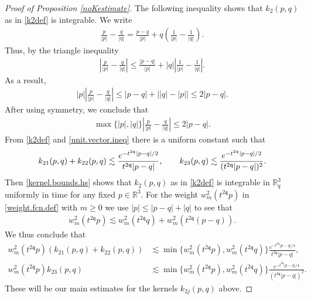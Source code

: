 \documentclass[reqno]{amsart}
\newcommand{\pv}{p}
\newcommand{\pZ}{|\pv|}
\newcommand{\qv}{q}
\newcommand{\qZ}{|\qv|}
\newcommand{\vnrm}[1]{\left\vert#1\right\vert}
\newcommand{\threed}{{\mathbb R}^3}
\newcommand{\qq}{\mathfrak{q}}
\newcommand{\tqq}{t^{2\qq}}
\theoremstyle{definition}
\numberwithin{equation}{section}
\numberwithin{theorem}{section}
\begin{document}
\begin{proof}[Proof of Proposition \ref{noKestimate}]
The following inequality shows that $k_2(p,q)$ as in \eqref{k2def} is integrable.  We write
\begin{align*}
    \frac{\pv}{\pZ} -\frac{\qv}{\qZ}
    =
    \frac{\pv-\qv}{\pZ} +\qv\left(\frac{1}{\pZ}-\frac{1}{\qZ}\right).
\end{align*}
Thus, by the triangle inequality
\begin{align*}
   \left| \frac{\pv}{\pZ} -\frac{\qv}{\qZ}\right|
    \leq
    \frac{|\pv-\qv|}{\pZ} +|\qv|\left|\frac{1}{\pZ}-\frac{1}{\qZ}\right|.
\end{align*}
As a result, 
\begin{align*}
  \vnrm{\pv} \left| \frac{\pv}{\pZ} -\frac{\qv}{\qZ}\right|
    \leq
    \vnrm{\pv-\qv}
 +\vnrm{\vnrm{\qv}-\vnrm{\pv}}
     \leq
    2\vnrm{\pv-\qv}.
\end{align*}
After  using symmetry, we conclude that 
\begin{align}\label{unit.vector.ineq}
  \max\{\pZ, \qZ\} \left| \frac{\pv}{\pZ} -\frac{\qv}{\qZ}\right|
    \leq
    2|\pv-\qv|.
\end{align}
From \eqref{k2def} and \eqref{unit.vector.ineq} there is a uniform constant such that
\begin{align}\notag
    k_{21}(p,q)  +k_{22}(p,q) 
    \lesssim
    \frac{e^{- \tqq|p-q|/2}}{\tqq|p-q|},
    \qquad 
    k_{23}(p,q) 
    \lesssim
    \frac{e^{- \tqq|p-q|/2}}{(\tqq|p-q|)^2}.
\end{align}
Then \eqref{kernel.bounds.hs} shows that $k_2(p,q)$ as in \eqref{k2def} is  integrable in $\mathbb{R}^3_q$ uniformly in time for any fixed $\pv \in \threed$.  For the weight $w_{m}^2(\tqq \pv)$ in \eqref{weight.fcn.def} with $m\ge 0$ we use $|p| \leq |p-q| + |q|$ to see that 
\begin{align*}
    w_{m}^2(\tqq \pv) \lesssim w_{m}^2(\tqq \qv)+w_{m}^2(\tqq (\pv-\qv)).
\end{align*}
We thus conclude that 
\begin{equation}\label{kernel.bounds.hs}
\begin{split}
    w_{m}^2(\tqq \pv)\left(k_{21}(p,q)  + k_{22}(p,q) \right)
   & \lesssim
    \min\big\{w_{m}^2(\tqq \pv), w_{m}^2(\tqq \qv)\big\}\frac{e^{- \tqq|p-q|/4}}{\tqq|p-q|},
\\
   w_{m}^2(\tqq \pv) k_{23}(p,q) 
   & \lesssim
   \min\big\{w_{m}^2(\tqq \pv), w_{m}^2(\tqq \qv)\big\} \frac{e^{- \tqq|p-q|/4}}{(\tqq|p-q|)^2}.
\end{split}
\end{equation}
These will be our main estimates for the kernels $k_{2j}(p,q)$ above.



\end{proof}
\end{document}
